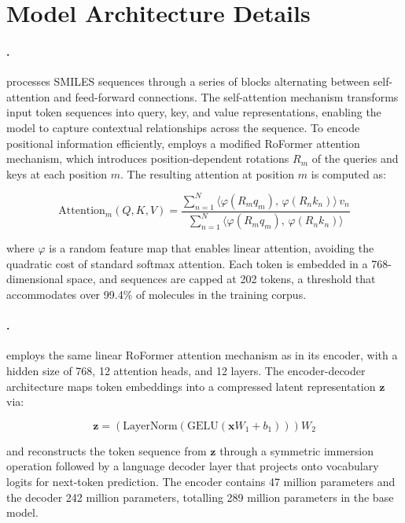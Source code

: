\section{Model Architecture Details}
\label{appendix:architecture}

\paragraph{\molm{}.}
\molm{} processes SMILES sequences through a series of blocks alternating between self-attention and feed-forward connections. The self-attention mechanism transforms input token sequences into query, key, and value representations, enabling the model to capture contextual relationships across the sequence. To encode positional information efficiently, \molm{} employs a modified RoFormer attention mechanism, which introduces position-dependent rotations $R_m$ of the queries and keys at each position $m$. The resulting attention at position $m$ is computed as:

\begin{equation}
\text{Attention}_m(Q, K, V) = \frac{\sum_{n=1}^{N} \langle \varphi(R_m q_m),\, \varphi(R_n k_n) \rangle\, v_n}{\sum_{n=1}^{N} \langle \varphi(R_m q_m),\, \varphi(R_n k_n) \rangle}
\end{equation}

where $\varphi$ is a random feature map that enables linear attention, avoiding the quadratic cost of standard softmax attention. Each token is embedded in a 768-dimensional space, and sequences are capped at 202 tokens, a threshold that accommodates over 99.4\% of molecules in the training corpus.

\paragraph{\smi{}.}
\smi{} employs the same linear RoFormer attention mechanism as \molm{} in its encoder, with a hidden size of 768, 12 attention heads, and 12 layers. The encoder-decoder architecture maps token embeddings into a compressed latent representation $\mathbf{z}$ via:

\begin{equation}
\mathbf{z} = \left(\text{LayerNorm}\left(\text{GELU}\left(\mathbf{x} W_1 + b_1\right)\right)\right) W_2
\end{equation}

and reconstructs the token sequence from $\mathbf{z}$ through a symmetric immersion operation followed by a language decoder layer that projects onto vocabulary logits for next-token prediction. The encoder contains 47 million parameters and the decoder 242 million parameters, totalling 289 million parameters in the base model.
